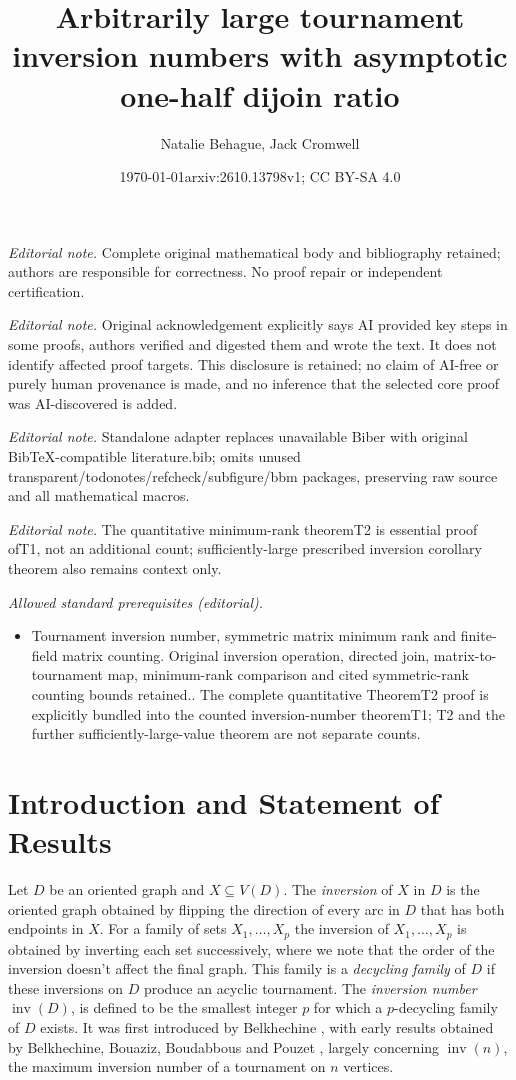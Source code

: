 \documentclass[10pt,a4paper]{amsart}
\date{\today}
\title{Arbitrarily large tournament inversion numbers with asymptotic one-half dijoin ratio}
\author{Natalie Behague, Jack Cromwell}
\date{arxiv:2610.13798v1; CC BY-SA 4.0}
\numberwithin{equation}{section}
\theoremstyle{plain}
\theoremstyle{remark}
\theoremstyle{definition}
\newcommand{\inv}{\operatorname{inv}}
\begin{document}
\maketitle
\noindent\textit{Editorial note.} Complete original mathematical body and bibliography retained; authors are responsible for correctness. No proof repair or independent certification.\par\medskip
\noindent\textit{Editorial note.} Original acknowledgement explicitly says AI provided key steps in some proofs, authors verified and digested them and wrote the text. It does not identify affected proof targets. This disclosure is retained; no claim of AI-free or purely human provenance is made, and no inference that the selected core proof was AI-discovered is added.\par\medskip
\noindent\textit{Editorial note.} Standalone adapter replaces unavailable Biber with original BibTeX-compatible literature.bib; omits unused transparent/todonotes/refcheck/subfigure/bbm packages, preserving raw source and all mathematical macros.\par\medskip
\noindent\textit{Editorial note.} The quantitative minimum-rank theoremT2 is essential proof ofT1, not an additional count; sufficiently-large prescribed inversion corollary theorem also remains context only.\par\medskip
\noindent\textit{Allowed standard prerequisites (editorial).}\begin{itemize}
\item Tournament inversion number, symmetric matrix minimum rank and finite-field matrix counting. Original inversion operation, directed join, matrix-to-tournament map, minimum-rank comparison and cited symmetric-rank counting bounds retained.. The complete quantitative TheoremT2 proof is explicitly bundled into the counted inversion-number theoremT1; T2 and the further sufficiently-large-value theorem are not separate counts.
\end{itemize}\medskip
 \section{Introduction and Statement of Results}

 Let $D$ be an oriented graph and $X \subseteq V(D)$. The \emph{inversion} of $X$ in $D$ is the oriented graph obtained by flipping the direction of every arc in $D$ that has both endpoints in $X$. For a family of sets $X_1,\dots,X_p$ the inversion of $X_1,\dots,X_p$ is obtained by inverting each set successively, where we note that the order of the inversion doesn't affect the final graph. This family is a \emph{decycling family} of $D$ if these inversions on $D$ produce an acyclic tournament. The \emph{inversion number} $\inv(D)$, is defined to be the smallest integer $p$ for which a $p$-decycling family of $D$ exists. It was first introduced by Belkhechine \cite{Bel}, with early results obtained by Belkhechine, Bouaziz, Boudabbous and Pouzet \cite{Belk}, largely concerning $\inv(n)$, the maximum inversion number of a tournament on $n$ vertices.
\end{document}
